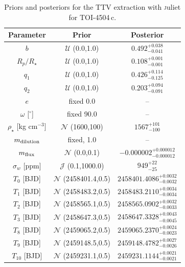 \documentclass[twocolumn,twocolappendix]{aastex631}
\begin{document}
\begin{table}[]
\caption{Priors and posteriors for the TTV extraction with {\textsc juliet} for TOI-4504\,c.}
\centering
\label{ttv_juliet}
\begin{tabular}{ccc}
 \hline 
  \hline
Parameter       & Prior                         & Posterior                           \\ \hline
$b$               & $\mathcal{U}$ (0.0,1.0)       & $0.492^{+0.038}_{-0.041}$           \\
$R_p/R_{\star}$               & $\mathcal{U}$ (0.0,1.0)       & $0.108^{+0.001}_{-0.001}$           \\
$q_1$        & $\mathcal{U}$ (0.0,1.0)       & $0.426^{+0.114}_{-0.125}$           \\
$q_2$        & $\mathcal{U}$ (0.0,1.0)       & $0.203^{+0.094}_{-0.091}$           \\
$e$               & fixed 0.0                     & --                                  \\
$\omega$ [$^\circ$]           & fixed 90.0                    & --                                  \\
$\rho_{\star}$ [kg cm$^{-3}$]             & $\mathcal{N}$ (1600,100)      & $1567^{+101}_{-100}$                \\
$m_{\rm dilution}$ & fixed, 1.0                    & --                                  \\
$m_{\rm flux}$     & $\mathcal{N}$ (0.0,0.1)       & $-0.000002^{+0.000012}_{-0.000012}$ \\
$\sigma_w$ [ppm]  & $\mathcal{J}$ (0.1,1000.0)    & $949^{+22}_{-25}$                   \\
$T_0$ [BJD] & $\mathcal{N}$ (2458401.4,0.5) & $2458401.4086^{+0.0032}_{-0.0032}$  \\
$T_1$ [BJD]  & $\mathcal{N}$ (2458483.2,0.5) & $2458483.2110^{+0.0034}_{-0.0034}$  \\
$T_2$ [BJD] & $\mathcal{N}$ (2458565.1,0.5) & $2458565.0902^{+0.0032}_{-0.0033}$  \\
$T_3$ [BJD] & $\mathcal{N}$ (2458647.3,0.5) & $2458647.3328^{+0.0043}_{-0.0045}$  \\
$T_8$ [BJD] & $\mathcal{N}$ (2459065.2,0.5) & $2459065.2370^{+0.0024}_{-0.0023}$  \\
$T_9$ [BJD] & $\mathcal{N}$ (2459148.5,0.5) & $2459148.4782^{+0.0027}_{-0.0026}$  \\
$T_{10}$ [BJD] & $\mathcal{N}$ (2459231.1,0.5) & $2459231.1144^{+0.0021}_{-0.0021}$  \\

\end{tabular}
\end{table}
\end{document}
